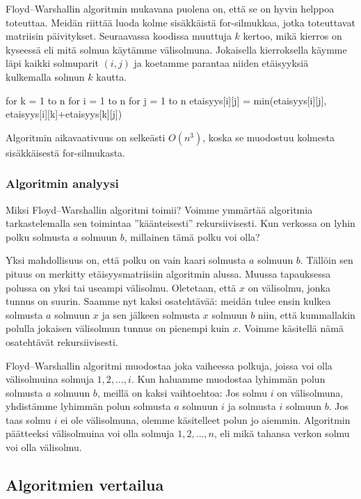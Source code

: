 Floyd–Warshallin algoritmin mukavana puolena on,
että se on hyvin helppoa toteuttaa.
Meidän riittää luoda kolme sisäkkäistä for-silmukkaa,
jotka toteuttavat matriisin päivitykset.
Seuraavassa koodissa muuttuja $k$ kertoo,
mikä kierros on kyseessä eli mitä solmua käytämme välisolmuna.
Jokaisella kierroksella käymme läpi kaikki solmuparit $(i,j)$
ja koetamme parantaa niiden etäisyyksiä kulkemalla solmun $k$ kautta.

\begin{code}
for k = 1 to n
    for i = 1 to n
        for j = 1 to n
            etaisyys[i][j] = min(etaisyys[i][j],
                                   etaisyys[i][k]+etaisyys[k][j])
\end{code}

Algoritmin aikavaativuus on selkeästi $O(n^3)$,
koska se muodostuu kolmesta sisäkkäisestä for-silmukasta.

\subsubsection{Algoritmin analyysi}

Miksi Floyd–Warshallin algoritmi toimii?
Voimme ymmärtää algoritmia tarkastelemalla
sen toimintaa ''käänteisesti'' rekursiivisesti.
Kun verkossa on lyhin polku solmusta $a$ solmuun $b$,
millainen tämä polku voi olla?

Yksi mahdollisuus on, että polku on vain kaari
solmusta $a$ solmuun $b$.
Tällöin sen pituus on merkitty etäisyysmatriisiin
algoritmin alussa.
Muussa tapauksessa polussa on yksi tai useampi välisolmu.
Oletetaan, että $x$ on välisolmu, jonka tunnus on suurin.
Saamme nyt kaksi osatehtävää:
meidän tulee ensin kulkea solmusta $a$ solmuun $x$
ja sen jälkeen solmusta $x$ solmuun $b$ niin,
että kummallakin polulla jokaisen välisolmun
tunnus on pienempi kuin $x$.
Voimme käsitellä nämä osatehtävät rekursiivisesti.

Floyd–Warshallin algoritmi muodostaa joka vaiheessa
polkuja, joissa voi olla välisolmuina solmuja $1,2,\dots,i$.
Kun haluamme muodostaa lyhimmän polun solmusta $a$ solmuun $b$,
meillä on kaksi vaihtoehtoa:
Jos solmu $i$ on välisolmuna, yhdistämme lyhimmän polun
solmusta $a$ solmuun $i$ ja solmusta $i$ solmuun $b$.
Jos taas solmu $i$ ei ole välisolmuna, olemme käsitelleet
polun jo aiemmin.
Algoritmin päätteeksi välisolmuina voi olla solmuja $1,2,\dots,n$,
eli mikä tahansa verkon solmu voi olla välisolmu.

\subsection{Algoritmien vertailua}

